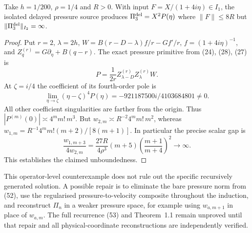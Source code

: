 \begin{proposition}
Take $h=1/200$, $\rho=1/4$ and $R>0$.
With input $F=X/(1+4i\eta)\in I_1$,
the isolated delayed pressure source produces
$\Pi_3^{\rm del}=X^2P(\eta)$ where
$\|F\|\le8R$ but $\|\Pi_3^{\rm del}\|_{I_2}=\infty$.
\end{proposition}
\begin{proof}
Put $r=2$, $\lambda=2h$,
$W=B(r-D-\lambda)f/r-Gf'/r$,
$f=(1+4i\eta)^{-1}$, and
$Z_q^{(r)}=G\partial_\eta+B(q-r)$.
The exact pressure primitive from (24), (28), (27) is
\[
 P=\frac1{2r}Z_{\lambda-D}^{(r)}Z_\lambda^{(r)}W.
\]
At $\zeta=i/4$ the coefficient of its fourth-order pole is
\[
 \lim_{\eta\to\zeta}(\eta-\zeta)^4P(\eta)
 =-921187500i/4103684801\ne0.
\]
All other coefficient singularities are farther from the
origin. Thus $|P^{(m)}(0)|\asymp4^m m!\,m^3$.
But $w_{2,m}\asymp R^{-2}4^m m!\,m^2$, whereas
$w_{1,m}=R^{-1}4^m m!(m+2)/[8(m+1)]$.
In particular the precise scalar gap is
\[
 \frac{w_{1,m+3}}{4w_{2,m}}
 =\frac{27R}{4\rho^3}(m+5)
       \left(\frac{m+1}{m+4}\right)^2\longrightarrow\infty.
\]
This establishes the claimed unboundedness.
\end{proof}
This operator-level counterexample does not rule out the
specific recursively generated solution. A possible repair is
to eliminate the bare pressure norm from (52), use the
regularised pressure-to-velocity composite throughout the
induction, and reconstruct $\Pi_n$ in a weaker pressure
space, for example using $w_{a,m+1}$ in place of $w_{a,m}$.
The full recurrence (53) and Theorem~1.1 remain unproved
until that repair and all physical-coordinate reconstructions
are independently verified.

